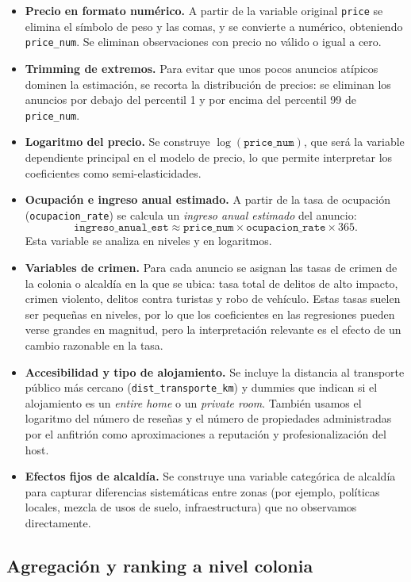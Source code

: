 \documentclass[12pt]{article}
\begin{document}
\begin{itemize}
  \item \textbf{Precio en formato numérico.} A partir de la variable original \texttt{price} se elimina el símbolo de peso y las comas, y se convierte a numérico, obteniendo \texttt{price\_num}. Se eliminan observaciones con precio no válido o igual a cero.
  \item \textbf{Trimming de extremos.} Para evitar que unos pocos anuncios atípicos dominen la estimación, se recorta la distribución de precios: se eliminan los anuncios por debajo del percentil 1 y por encima del percentil 99 de \texttt{price\_num}.
  \item \textbf{Logaritmo del precio.} Se construye \(\log(\texttt{price\_num})\), que será la variable dependiente principal en el modelo de precio, lo que permite interpretar los coeficientes como semi-elasticidades.
  \item \textbf{Ocupación e ingreso anual estimado.} A partir de la tasa de ocupación (\texttt{ocupacion\_rate}) se calcula un \emph{ingreso anual estimado} del anuncio:
  \[
  \texttt{ingreso\_anual\_est} \approx \texttt{price\_num} \times \texttt{ocupacion\_rate} \times 365.
  \]
  Esta variable se analiza en niveles y en logaritmos.
  \item \textbf{Variables de crimen.} Para cada anuncio se asignan las tasas de crimen de la colonia o alcaldía en la que se ubica: tasa total de delitos de alto impacto, crimen violento, delitos contra turistas y robo de vehículo. Estas tasas suelen ser pequeñas en niveles, por lo que los coeficientes en las regresiones pueden verse grandes en magnitud, pero la interpretación relevante es el efecto de un cambio razonable en la tasa.
  \item \textbf{Accesibilidad y tipo de alojamiento.} Se incluye la distancia al transporte público más cercano (\texttt{dist\_transporte\_km}) y dummies que indican si el alojamiento es un \emph{entire home} o un \emph{private room}. También usamos el logaritmo del número de reseñas y el número de propiedades administradas por el anfitrión como aproximaciones a reputación y profesionalización del host.
  \item \textbf{Efectos fijos de alcaldía.} Se construye una variable categórica de alcaldía para capturar diferencias sistemáticas entre zonas (por ejemplo, políticas locales, mezcla de usos de suelo, infraestructura) que no observamos directamente.
\end{itemize}

\subsection{Agregación y ranking a nivel colonia}
\end{document}
